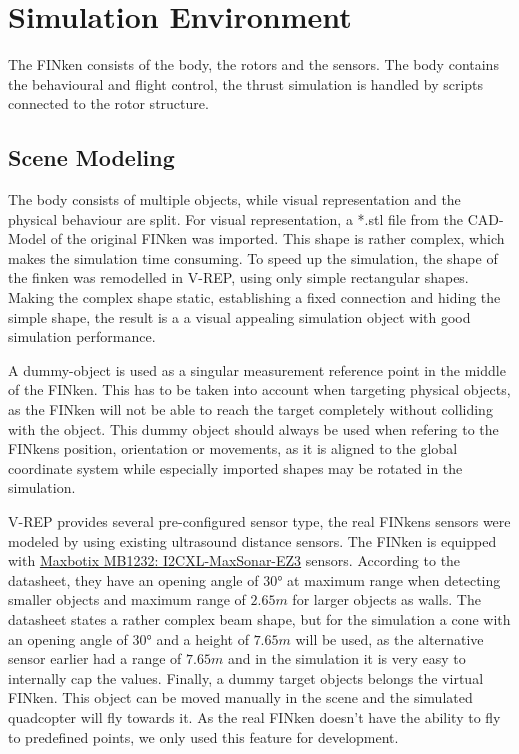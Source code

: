 \label{chap:implementation}

\section{Simulation Environment}

The FINken consists of the body, the rotors and the sensors. The body contains the behavioural and flight control, the thrust simulation is handled by scripts connected to the rotor structure.

\subsection{Scene Modeling}
\label{sec:sceneMod}

The body consists of multiple objects, while visual representation and the physical behaviour are split. 
For visual representation, a *.stl file from the CAD-Model of the original FINken was imported. 
This shape is rather complex, which makes the simulation time consuming. 
To speed up the simulation, the shape of the finken was remodelled in V-REP, using only simple rectangular shapes. 
Making the complex shape static, establishing a fixed connection and hiding the simple shape, the result is a a visual appealing simulation object with good simulation performance. 

A dummy-object is used as a singular measurement reference point in the middle of the FINken. 
This has to be taken into account when targeting physical objects, as the FINken will not be able to reach the target completely without colliding with the object. 
This dummy object should always be used when refering to the FINkens position, orientation or movements, as it is aligned to the global coordinate system while especially imported shapes may be rotated in the simulation. 

V-REP provides several pre-configured sensor type, the real FINkens sensors were modeled by using existing ultrasound distance sensors. 
The FINken is equipped with \href{http://www.maxbotix.com/documents/I2CXL-MaxSonar-EZ_Datasheet.pdf}{Maxbotix MB1232: I2CXL-MaxSonar-EZ3} sensors. 
According to the datasheet, they have an opening angle of $\ang{30}$ at maximum range when detecting smaller objects and maximum range of $2.65m$ for larger objects as walls. 
The datasheet states a rather complex beam shape, but for the simulation a cone with an opening angle of $\ang{30}$  and a height of $7.65m$ will be used, as the alternative sensor earlier had a range of $7.65m$ and in the simulation it is very easy to internally cap the values. 
Finally, a dummy target objects belongs the virtual FINken. 
This object can be moved manually in the scene and the simulated quadcopter will fly towards it.  
As the real FINken doesn't have the ability to fly to predefined points, we only used this feature for development.

